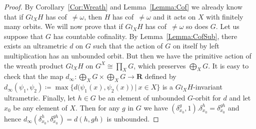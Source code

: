\documentclass[a4paper]{article}
\theoremstyle{definition}
\newcommand*{\field}[1]{\mathbf{#1}}
\newcommand*{\R}{\field{R}}
\newcommand{\setst}[2]{\{#1\ |\ #2\}}
\begin{document}
\begin{proof}
By Corollary~\ref{Cor:Wreath} and Lemma~\ref{Lemma:Cof} we already know that if $G \wr_X H$ has cof~$\neq\omega$, then $H$ has cof~$\neq\omega$ and it acts on $X$ with finitely many orbits.
We will now prove that if $G \wr_X H$ has cof~$\neq\omega$ so does $G$.
Let us suppose that $G$ has countable cofinality. By Lemma~\ref{Lemma:CofSub}, there exists an ultrametric $d$ on $G$ such that the action of $G$ on itself by left multiplication has an unbounded orbit.
But then we have the primitive action of the wreath product $G\wr_XH$ on $G^X\cong\prod_XG$,
which preserves $\bigoplus_XG$.
It is easy to check that the map $d_\infty\colon\bigoplus_XG\times\bigoplus_XG\to\R$ defined by $d_\infty(\psi_1,\psi_2)\coloneqq\max\setst{d\bigl(\psi_1(x),\psi_2(x)\bigr)}{x\in X}$ is a $G\wr_XH$-invariant ultrametric.
Finally, let $h\in G$ be an element of unbounded $G$-orbit for $d$ and let $x_0$ be any element of $X$. Then for any $g$ in $G$ we have $(\delta_{x_0}^g,1).\delta_{x_0}^h=\delta_{x_0}^{gh}$ and hence $d_\infty(\delta_{x_0}^h,\delta_{x_0}^{gh})=d(h,gh)$ is unbounded.


\end{proof}
\end{document}
